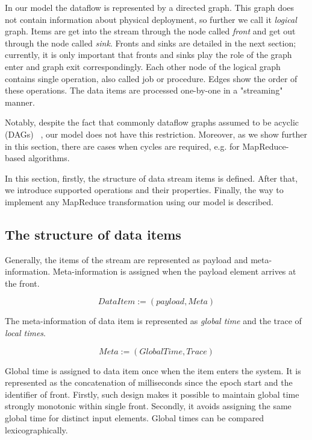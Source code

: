 
\label {fs-model-section}


In our model the dataflow is represented by a directed graph. This graph does not contain information about physical deployment, so further we call it {\it logical} graph. Items are get into the stream through the node called {\it front} and get out through the node called {\it sink}. Fronts and sinks are detailed in the next section; currently, it is only important that fronts and sinks play the role of the graph enter and graph exit correspondingly. Each other node of the logical graph contains single operation, also called job or procedure. Edges show the order of these operations. The data items are processed one-by-one in a "streaming" manner. 

Notably, despite the fact that commonly dataflow graphs assumed to be acyclic (DAGs) 
~\cite{Zaharia:2016:ASU:3013530.2934664, Carbone:2017:SMA:3137765.3137777},
our model does not have this restriction. Moreover, as we show further in this section, there are cases when cycles are required, e.g. for MapReduce-based algorithms. 

In this section, firstly, the structure of data stream items is defined. After that, we introduce supported operations and their properties. Finally, the way to implement any MapReduce transformation using our model is described.

\subsection{The structure of data items}
Generally, the items of the stream are represented as payload and meta-information. Meta-information is assigned when the payload element arrives at the front. 

\[DataItem := (payload, Meta)\]

The meta-information of data item is represented as {\it global time} and the trace of {\it local times}.

\[Meta := (GlobalTime, Trace)\]

Global time is assigned to data item once when the item enters the system. It is represented as the concatenation of milliseconds since the epoch start and the identifier of front. Firstly, such design makes it possible to maintain global time strongly monotonic within single front. Secondly, it avoids assigning the same global time for distinct input elements. Global times can be compared lexicographically.

